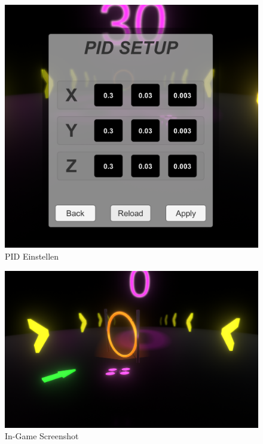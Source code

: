 \begin{figure}[H]
  \begin{center}
    \includegraphics[width=0.6\linewidth]{content/images/PID.png}
    \caption{PID Einstellen}
  \end{center}
\end{figure}

\begin{figure}[H]
  \begin{center}
    \includegraphics[width=0.6\linewidth]{content/images/game.png}
    \caption{In-Game Screenshot}
  \end{center}
\end{figure}